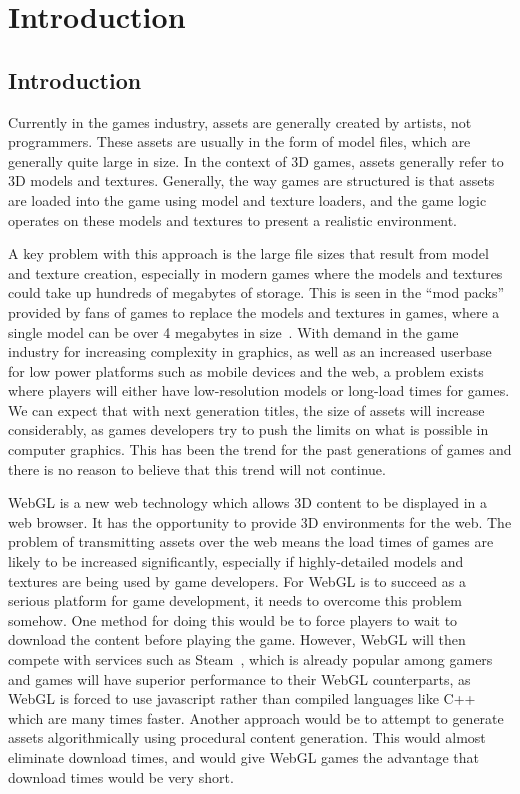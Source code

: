 \chapter{Introduction}
\section{Introduction}
Currently in the games industry, assets are generally created by artists, not programmers.
These assets are usually in the form of model files, which are generally quite large in size.
In the context of 3D games, assets generally refer to 3D models and textures.
Generally, the way games are structured is that assets are loaded into the game using model and texture loaders, and the game logic operates on these models and textures to present a realistic environment.

A key problem with this approach is the large file sizes that result from model and texture creation, especially in modern games where the models and textures could take up hundreds of megabytes of storage. 
This is seen in the ``mod packs'' provided by fans of games to replace the models and textures in games, where a single model can be over 4 megabytes in size~\cite{web:oblivionmodpack}.
With demand in the game industry for increasing complexity in graphics, as well as an increased userbase for low power platforms such as mobile devices and the web, a problem exists where players will either have low-resolution models or long-load times for games.
We can expect that with next generation titles, the size of assets will increase considerably, as games developers try to push the limits on what is possible in computer graphics.
This has been the trend for the past generations of games and there is no reason to believe that this trend will not continue.

WebGL is a new web technology which allows 3D content to be displayed in a web browser.
It has the opportunity to provide 3D environments for the web.
The problem of transmitting assets over the web means the load times of games are likely to be increased significantly, especially if highly-detailed models and textures are being used by game developers.
For WebGL is to succeed as a serious platform for game development, it needs to overcome this problem somehow.
One method for doing this would be to force players to wait to download the content before playing the game.
However, WebGL will then compete with services such as Steam~\cite{web:steam}, which is already popular among gamers and games will have superior performance to their WebGL counterparts, as WebGL is forced to use javascript rather than compiled languages like C++ which are many times faster.
Another approach would be to attempt to generate assets algorithmically using procedural content generation.
This would almost eliminate download times, and would give WebGL games the advantage that download times would be very short.

